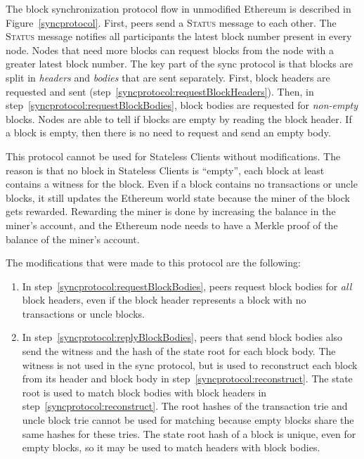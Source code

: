 \documentclass[12pt]{article}
\newcounter{protocol}
\begin{document}
The block synchronization protocol flow in unmodified Ethereum is described in Figure~\ref{syncprotocol}. First, peers send a \textsc{Status} message to each other. The \textsc{Status} message notifies all participants the latest block number present in every node. Nodes that need more blocks can request blocks from the node with a greater latest block number. The key part of the sync protocol is that blocks are split in \emph{headers} and \emph{bodies} that are sent separately. First, block headers are requested and sent (step~\ref{syncprotocol:requestBlockHeaders}). Then, in step~\ref{syncprotocol:requestBlockBodies}, block bodies are requested for \emph{non-empty} blocks. Nodes are able to tell if blocks are empty by reading the block header. If a block is empty, then there is no need to request and send an empty body.


This protocol cannot be used for Stateless Clients without modifications. The reason is that no block in Stateless Clients is ``empty'', each block at least contains a witness for the block. Even if a block contains no transactions or uncle blocks, it still updates the Ethereum world state because the miner of the block gets rewarded. Rewarding the miner is done by increasing the balance in the miner's account, and the Ethereum node needs to have a Merkle proof of the balance of the miner's account.

The modifications that were made to this protocol are the following:
\begin{enumerate}
  \item In step~\ref{syncprotocol:requestBlockBodies}, peers request block bodies for \emph{all} block headers, even if the block header represents a block with no transactions or uncle blocks.
  \item In step~\ref{syncprotocol:replyBlockBodies}, peers that send block bodies also send the witness and the hash of the state root for each block body. The witness is not used in the sync protocol, but is used to reconstruct each block from its header and block body in step~\ref{syncprotocol:reconstruct}. The state root is used to match block bodies with block headers in step~\ref{syncprotocol:reconstruct}. The root hashes of the transaction trie and uncle block trie cannot be used for matching because empty blocks share the same hashes for these tries. The state root hash of a block is unique, even for empty blocks, so it may be used to match headers with block bodies.
\end{enumerate}
\end{document}
